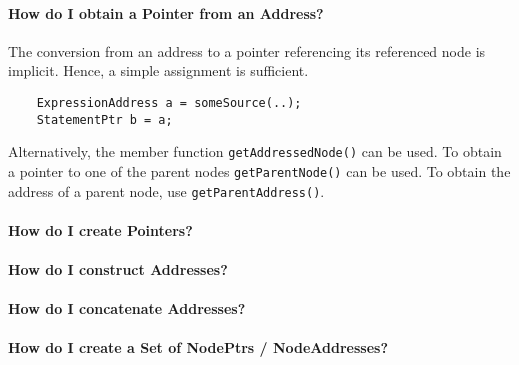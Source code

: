 \paragraph{How do I obtain a Pointer from an Address?}
The conversion from an address to a pointer referencing its referenced node is
implicit. Hence, a simple assignment is sufficient.
\begin{lstlisting}
	ExpressionAddress a = someSource(..);
	StatementPtr b = a;
\end{lstlisting}
Alternatively, the member function \lstinline|getAddressedNode()| can be used.
To obtain a pointer to one of the parent nodes \lstinline|getParentNode()| can
be used. To obtain the address of a parent node, use
\lstinline|getParentAddress()|.

\paragraph{How do I create Pointers?}

\paragraph{How do I construct Addresses?}

\paragraph{How do I concatenate Addresses?}

\paragraph{How do I create a Set of NodePtrs / NodeAddresses?}



